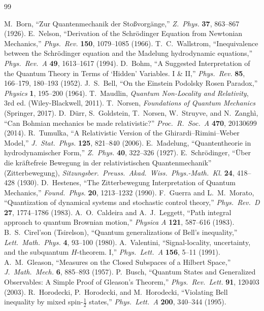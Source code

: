\documentclass[11pt]{article}
\begin{document}
\begingroup\small
\begin{thebibliography}{99}
 M.~Born, ``Zur Quantenmechanik der Sto\ss vorg\"ange,''
  \emph{Z.\ Phys.} \textbf{37}, 863--867 (1926).
 E.~Nelson, ``Derivation of the Schr\"odinger Equation from Newtonian Mechanics,''
  \emph{Phys.\ Rev.} \textbf{150}, 1079--1085 (1966).
 T.~C.~Wallstrom, ``Inequivalence between the Schr\"odinger equation and the
  Madelung hydrodynamic equations,'' \emph{Phys.\ Rev.\ A} \textbf{49}, 1613--1617 (1994).
 D.~Bohm, ``A Suggested Interpretation of the Quantum Theory in Terms of `Hidden'
  Variables. I \& II,'' \emph{Phys.\ Rev.} \textbf{85}, 166--179, 180--193 (1952).
 J.~S.~Bell, ``On the Einstein Podolsky Rosen Paradox,''
  \emph{Physics} \textbf{1}, 195--200 (1964).
 T.~Maudlin, \emph{Quantum Non-Locality and Relativity}, 3rd ed.
  (Wiley-Blackwell, 2011).
 T.~Norsen, \emph{Foundations of Quantum Mechanics} (Springer, 2017).
 D.~D\"urr, S.~Goldstein, T.~Norsen, W.~Struyve, and N.~Zangh\`i, ``Can Bohmian
  mechanics be made relativistic?'' \emph{Proc.\ R.\ Soc.\ A} \textbf{470}, 20130699 (2014).
 R.~Tumulka, ``A Relativistic Version of the Ghirardi--Rimini--Weber Model,''
  \emph{J.\ Stat.\ Phys.} \textbf{125}, 821--840 (2006).
 E.~Madelung, ``Quantentheorie in hydrodynamischer Form,''
  \emph{Z.\ Phys.} \textbf{40}, 322--326 (1927).
 E.~Schr\"odinger, ``\"Uber die kr\"aftefreie Bewegung in der relativistischen
  Quantenmechanik'' (Zitterbewegung), \emph{Sitzungsber.\ Preuss.\ Akad.\ Wiss.\ Phys.-Math.\ Kl.}
  \textbf{24}, 418--428 (1930).
 D.~Hestenes, ``The Zitterbewegung Interpretation of Quantum Mechanics,''
  \emph{Found.\ Phys.} \textbf{20}, 1213--1232 (1990).
 F.~Guerra and L.~M.~Morato, ``Quantization of dynamical systems and stochastic
  control theory,'' \emph{Phys.\ Rev.\ D} \textbf{27}, 1774--1786 (1983).
 A.~O.~Caldeira and A.~J.~Leggett, ``Path integral approach to quantum
  Brownian motion,'' \emph{Physica A} \textbf{121}, 587--616 (1983).
 B.~S.~Cirel'son (Tsirelson), ``Quantum generalizations of Bell's inequality,''
  \emph{Lett.\ Math.\ Phys.} \textbf{4}, 93--100 (1980).
 A.~Valentini, ``Signal-locality, uncertainty, and the subquantum
  $H$-theorem. I,'' \emph{Phys.\ Lett.\ A} \textbf{156}, 5--11 (1991).
 A.~M.~Gleason, ``Measures on the Closed Subspaces of a Hilbert Space,''
  \emph{J.\ Math.\ Mech.} \textbf{6}, 885--893 (1957).
 P.~Busch, ``Quantum States and Generalized Observables: A Simple Proof of Gleason's
  Theorem,'' \emph{Phys.\ Rev.\ Lett.} \textbf{91}, 120403 (2003).
 R.~Horodecki, P.~Horodecki, and M.~Horodecki, ``Violating Bell inequality by
  mixed spin-$\tfrac12$ states,'' \emph{Phys.\ Lett.\ A} \textbf{200}, 340--344 (1995).
\end{thebibliography}
\endgroup
\end{document}
